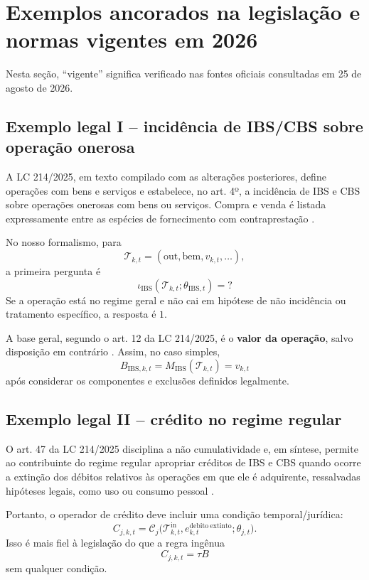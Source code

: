 \documentclass[11pt,a4paper]{article}
\newcommand{\IBS}{\mathrm{IBS}}
\newcommand{\cT}{\mathcal{T}}
\newcommand{\cC}{\mathcal{C}}
\begin{document}
\section{Exemplos ancorados na legislação e normas vigentes em 2026}

Nesta seção, ``vigente'' significa verificado nas fontes oficiais consultadas em 25 de agosto de 2026.

\subsection{Exemplo legal I -- incidência de IBS/CBS sobre operação onerosa}

A LC 214/2025, em texto compilado com as alterações posteriores, define operações com bens e serviços e estabelece, no art. 4º, a incidência de IBS e CBS sobre operações onerosas com bens ou serviços. Compra e venda é listada expressamente entre as espécies de fornecimento com contraprestação \cite{LC214}.

No nosso formalismo, para
\[
\cT_{k,t}=(\mathrm{out},\mathrm{bem},v_{k,t},\ldots),
\]
a primeira pergunta é
\[
\iota_{\IBS}(\cT_{k,t};\theta_{\IBS,t})=?
\]
Se a operação está no regime geral e não cai em hipótese de não incidência ou tratamento específico, a resposta é $1$.

A base geral, segundo o art. 12 da LC 214/2025, é o \textbf{valor da operação}, salvo disposição em contrário \cite{LC214,Dec12955}. Assim, no caso simples,
\[
B_{\IBS,k,t}=M_{\IBS}(\cT_{k,t})=v_{k,t}
\]
após considerar os componentes e exclusões definidos legalmente.

\subsection{Exemplo legal II -- crédito no regime regular}

O art. 47 da LC 214/2025 disciplina a não cumulatividade e, em síntese, permite ao contribuinte do regime regular apropriar créditos de IBS e CBS quando ocorre a extinção dos débitos relativos às operações em que ele é adquirente, ressalvadas hipóteses legais, como uso ou consumo pessoal \cite{LC214}.

Portanto, o operador de crédito deve incluir uma condição temporal/jurídica:
\begin{equation}
C_{j,k,t}
=
\cC_j\bigl(\cT_{k,t}^{\mathrm{in}},e_{k,t}^{\mathrm{debito\ extinto}};\theta_{j,t}\bigr).
\end{equation}
Isso é mais fiel à legislação do que a regra ingênua
\[
C_{j,k,t}=\tau B
\]
sem qualquer condição.
\end{document}
